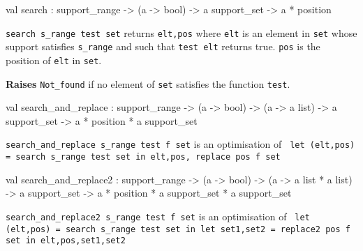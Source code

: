 \label{val:Constraint.search}\begin{ocamldoccode}
val search :
  support_range ->
  ({\textquotesingle}a -> bool) -> {\textquotesingle}a support_set -> {\textquotesingle}a * position
\end{ocamldoccode}
\begin{ocamldocdescription}
{\tt{search s\_range test set}} returns {\tt{elt,pos}} where {\tt{elt}} is an element in {\tt{set}} whose support
  satisfies {\tt{s\_range}} and such that {\tt{test elt}} returns true. {\tt{pos}} is the position of {\tt{elt}} in {\tt{set}}.

{\bf Raises} {\tt{Not\_found}} if no element of {\tt{set}} satisfies the function {\tt{test}}.


\end{ocamldocdescription}




\label{val:Constraint.search-underscoreand-underscorereplace}\begin{ocamldoccode}
val search_and_replace :
  support_range ->
  ({\textquotesingle}a -> bool) ->
  ({\textquotesingle}a -> {\textquotesingle}a list) ->
  {\textquotesingle}a support_set ->
  {\textquotesingle}a * position * {\textquotesingle}a support_set
\end{ocamldoccode}
\begin{ocamldocdescription}
{\tt{search\_and\_replace s\_range test f set}} is an optimisation of
{\tt{{} let (elt,pos) = search s\_range test set in\
elt,pos, replace pos f set{}}}


\end{ocamldocdescription}




\label{val:Constraint.search-underscoreand-underscorereplace2}\begin{ocamldoccode}
val search_and_replace2 :
  support_range ->
  ({\textquotesingle}a -> bool) ->
  ({\textquotesingle}a -> {\textquotesingle}a list * {\textquotesingle}a list) ->
  {\textquotesingle}a support_set ->
  {\textquotesingle}a * position * {\textquotesingle}a support_set *
  {\textquotesingle}a support_set
\end{ocamldoccode}
\begin{ocamldocdescription}
{\tt{search\_and\_replace2 s\_range test f set}} is an optimisation of
{\tt{{\char123} let (elt,pos) = search s\_range test set in\
let set1,set2 = replace2 pos f set in\
elt,pos,set1,set2{}}}


\end{ocamldocdescription}




